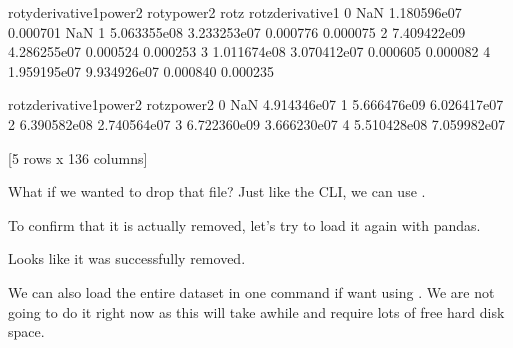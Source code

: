 \documentclass[letterpaper,10pt,english]{sphinxmanual}
\begin{document}
\begin{sphinxVerbatim}[commandchars=\\\{\}]
   rot\PYGZus{}y\PYGZus{}derivative1\PYGZus{}power2  rot\PYGZus{}y\PYGZus{}power2     rot\PYGZus{}z  rot\PYGZus{}z\PYGZus{}derivative1  \PYGZbs{}
0                       NaN  1.180596e\PYGZhy{}07 \PYGZhy{}0.000701                NaN   
1              5.063355e\PYGZhy{}08  3.233253e\PYGZhy{}07 \PYGZhy{}0.000776          \PYGZhy{}0.000075   
2              7.409422e\PYGZhy{}09  4.286255e\PYGZhy{}07 \PYGZhy{}0.000524           0.000253   
3              1.011674e\PYGZhy{}08  3.070412e\PYGZhy{}07 \PYGZhy{}0.000605          \PYGZhy{}0.000082   
4              1.959195e\PYGZhy{}07  9.934926e\PYGZhy{}07 \PYGZhy{}0.000840          \PYGZhy{}0.000235   

   rot\PYGZus{}z\PYGZus{}derivative1\PYGZus{}power2  rot\PYGZus{}z\PYGZus{}power2  
0                       NaN  4.914346e\PYGZhy{}07  
1              5.666476e\PYGZhy{}09  6.026417e\PYGZhy{}07  
2              6.390582e\PYGZhy{}08  2.740564e\PYGZhy{}07  
3              6.722360e\PYGZhy{}09  3.666230e\PYGZhy{}07  
4              5.510428e\PYGZhy{}08  7.059982e\PYGZhy{}07  

[5 rows x 136 columns]
\end{sphinxVerbatim}

What if we wanted to drop that file? Just like the CLI, we can use .

\begin{sphinxVerbatim}[commandchars=\\\{\}]
  \PYG{p}{[}\PYG{p}{]}
\end{sphinxVerbatim}

To confirm that it is actually removed, let’s try to load it again with pandas.

\begin{sphinxVerbatim}[commandchars=\\\{\}]
  \PYG{p}{[}\PYG{p}{]} 
\end{sphinxVerbatim}

Looks like it was successfully removed.

We can also load the entire dataset in one command if want using . We are not going to do it right now as this will take awhile and require lots of free hard disk space.
\end{document}
